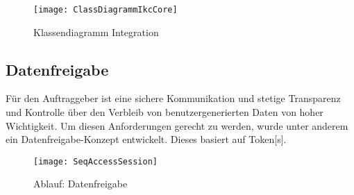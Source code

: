     \begin{figure}[H]
    \centering
    \texttt{[image: ClassDiagrammIkcCore]}
    \caption{Klassendiagramm Integration}
    \label{fig:classDiagrammIkcCore-easy}
    \end{figure}

\subsection{Datenfreigabe}
Für den Auftraggeber ist eine sichere Kommunikation und stetige Transparenz und Kontrolle über den Verbleib von benutzergenerierten Daten von hoher Wichtigkeit. Um diesen Anforderungen gerecht zu werden, wurde unter anderem ein Datenfreigabe-Konzept entwickelt. Dieses basiert auf \gls{Token}[s]. 







    \begin{figure}[H]
    \centering
    \texttt{[image: SeqAccessSession]}
    \caption{Ablauf: Datenfreigabe}
    \label{fig:seqaccesssession-easy}
    \end{figure}
